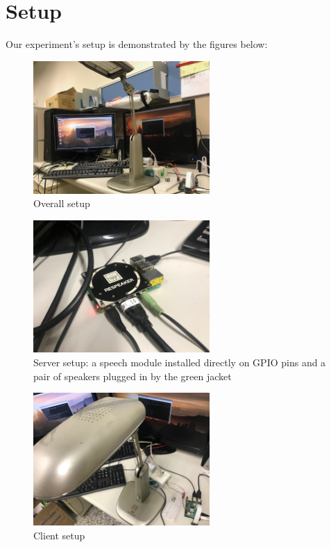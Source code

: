 \documentclass[12pt, a4paper, onside]{article}
\begin{document}
\section{Setup}
Our experiment's setup is demonstrated by the figures below:
\begin{figure}[h]
  \centering
  \includegraphics[angle=180, origin=c, width=0.6\textwidth]{img/overall_setup}
  \caption{Overall setup}
\end{figure}
\begin{figure}[h]
  \centering
  \includegraphics[angle=180, origin=c, width=0.6\textwidth]{img/server_setup}
  \caption{Server setup: a speech module installed directly on GPIO pins and a pair of speakers plugged in by the green jacket}
\end{figure}
\begin{figure}[h]
  \centering
  \includegraphics[angle=180, origin=c, width=0.6\textwidth]{img/client_setup}
  \caption{Client setup}
\end{figure}
\end{document}
